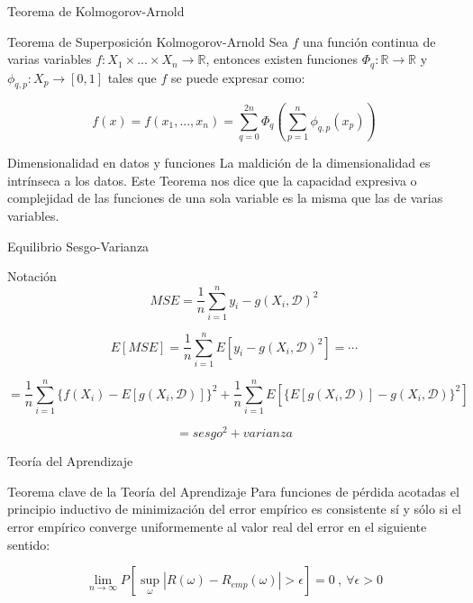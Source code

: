 \documentclass[10pt]{beamer}
\begin{document}
\begin{frame}[fragile]{Teorema de Kolmogorov-Arnold}
\vspace{10px}
\pause
{}

\begin{block}{Teorema de Superposición Kolmogorov-Arnold}
	Sea $f$ una función continua de varias variables $f:X_1 \times ... \times X_n \rightarrow \mathbb{R}$, entonces existen funciones $\Phi_q : \mathbb{R}\rightarrow \mathbb{R}$ y $\phi_{q,p} : X_p \rightarrow [0,1]$ tales que $f$ se puede expresar como:
	
	$$f(x) = f(x_1, ..., x_n) = \sum_{q=0}^{2n}\Phi_q ( \sum_{p=1}^{n}\phi_{q,p}(x_p))$$
\end{block}

\pause

\begin{alertblock}{Dimensionalidad en datos y funciones}
	La maldición de la dimensionalidad es intrínseca a los datos. Este Teorema nos dice que la capacidad expresiva o complejidad de las funciones de una sola variable es la misma que las de varias variables.
\end{alertblock}

\end{frame}

\begin{frame}[fragile]{Equilibrio Sesgo-Varianza}
\vspace{10px}
\pause
{}

\begin{block}{Notación}
	$$MSE = \frac{1}{n}\sum_{i=1}^{n}{y_i - g(X_i,\mathcal{D})}^2$$
	
	$$E[MSE] = \frac{1}{n}\sum_{i=1}^{n}E[{y_i - g(X_i,\mathcal{D})}^2] = \cdots$$
	
	$$ = \frac{1}{n}\sum_{i=1}^{n}\{ f(X_i) - E[g(X_i, \mathcal{D})] \}^2 + \frac{1}{n}\sum_{i=1}^{n}E[\{ E[g(X_i, \mathcal{D})] - g(X_i, \mathcal{D}) \}^2]$$
	
	$$ = sesgo^2 + varianza$$
\end{block}

\end{frame}

\begin{frame}[fragile]{Teoría del Aprendizaje}
\vspace{10px}
\pause
{}

\begin{block}{Teorema clave de la Teoría del Aprendizaje}
	Para funciones de pérdida acotadas el principio inductivo de minimización del error empírico es consistente sí y sólo si el error empírico converge uniformemente al valor real del error en el siguiente sentido:
	
	$$\lim\limits_{n\rightarrow \infty} P[\sup_{\omega}|R(\omega) - R_{emp}(\omega)|>\epsilon] = 0 \ , \ \forall \epsilon >0$$
\end{block}

\end{frame}
\end{document}
